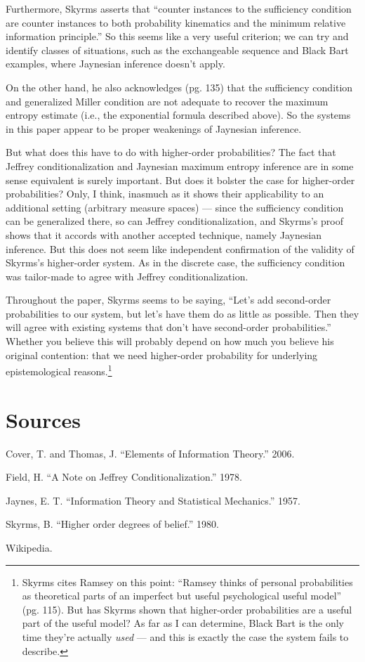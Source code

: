 \documentclass[letterpaper,12pt]{article}
\begin{document}
Furthermore, Skyrms asserts that ``counter instances to the sufficiency condition are counter instances to both probability kinematics and the minimum relative information principle.'' So this seems like a very useful criterion; we can try and identify classes of situations, such as the exchangeable sequence and Black Bart examples, where Jaynesian inference doesn't apply.

On the other hand, he also acknowledges (pg. 135) that the sufficiency condition and generalized Miller condition are not adequate to recover the maximum entropy estimate (i.e., the exponential formula described above). So the systems in this paper appear to be proper weakenings of Jaynesian inference.

But what does this have to do with higher-order probabilities? The fact that Jeffrey conditionalization and Jaynesian maximum entropy inference are in some sense equivalent is surely important. But does it bolster the case for higher-order probabilities? Only, I think, inasmuch as it shows their applicability to an additional setting (arbitrary measure spaces) --- since the sufficiency condition can be generalized there, so can Jeffrey conditionalization, and Skyrms's proof shows that it accords with another accepted technique, namely Jaynesian inference. But this does not seem like independent confirmation of the validity of Skyrms's higher-order system. As in the discrete case, the sufficiency condition was tailor-made to agree with Jeffrey conditionalization.

Throughout the paper, Skyrms seems to be saying, ``Let's add second-order probabilities to our system, but let's have them do as little as possible. Then they will agree with existing systems that don't have second-order probabilities.'' Whether you believe this will probably depend on how much you believe his original contention: that we need higher-order probability for underlying epistemological reasons.\footnote{Skyrms cites Ramsey on this point: ``Ramsey thinks of personal probabilities as theoretical parts of an imperfect but useful psychological useful model'' (pg. 115). But has Skyrms shown that higher-order probabilities are a useful part of the useful model? As far as I can determine, Black Bart is the only time they're actually \emph{used} --- and this is exactly the case the system fails to describe.}


\section{Sources}

Cover, T. and Thomas, J. ``Elements of Information Theory.'' 2006.

Field, H. ``A Note on Jeffrey Conditionalization.'' 1978.

Jaynes, E. T. ``Information Theory and Statistical Mechanics.'' 1957.

Skyrms, B. ``Higher order degrees of belief.'' 1980.

Wikipedia.
\end{document}

